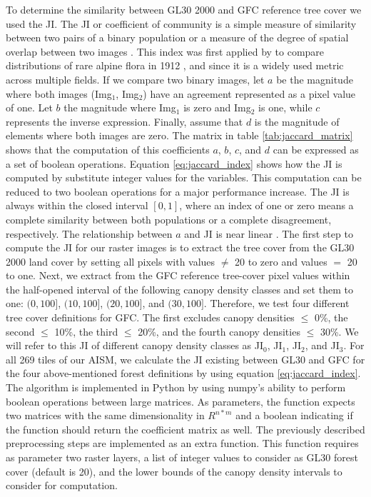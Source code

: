 			To determine the similarity between \ac{GL30} 2000 and \ac{GFC} reference tree cover we used the \ac{JI}. The \ac{JI} or coefficient of community is a simple measure of similarity between two pairs of a binary population or a measure of the degree of spatial overlap between two images \citep{Sampat2009}. This index was first applied by \citeauthor{Jaccard1912} to compare distributions of rare alpine flora in 1912 \citep{Jaccard1912}, and since it is a widely used metric across multiple fields. If we compare two binary images, let $a$ be the magnitude where both images (Img$_1$, Img$_2$) have an agreement represented as a pixel value of one. Let $b$ the magnitude where Img$_1$ is zero and Img$_2$ is one, while $c$ represents the inverse expression. Finally, assume that $d$ is the magnitude of elements where both images are zero. The matrix in table \ref{tab:jaccard_matrix} shows that the computation of this coefficients $a$, $b$, $c$, and $d$ can be expressed as a set of boolean operations. Equation \ref{eq:jaccard_index} shows how the \ac{JI} is computed by substitute integer values for the variables. This computation can be reduced to two boolean operations for a major performance increase. The \ac{JI} is always within the closed interval $[0,1]$, where an index of one or zero means a complete similarity between both populations or a complete disagreement, respectively. The relationship between $a$ and \ac{JI} is near linear \citep{Shi1993}. The first step to compute the \ac{JI} for our raster images is to extract the tree cover from the \ac{GL30} 2000 land cover by setting all pixels with values $\neq$ 20 to zero and values $=$ 20 to one. Next, we extract from the \ac{GFC} reference tree-cover pixel values within the half-opened interval of the following canopy density classes and set them to one: $(0,100]$, $(10,100]$, $(20,100]$, and $(30,100]$. Therefore, we test four different tree cover definitions for \ac{GFC}. The first excludes canopy densities $\leq$ 0\%, the second $\leq$ 10\%, the third $\leq$ 20\%, and the fourth  canopy densities $\leq$ 30\%. We will refer to this \ac{JI} of different canopy density classes as JI$_0$, JI$_1$, JI$_2$, and JI$_3$. For all 269 tiles of our \ac{AISM}, we calculate the \ac{JI} existing between \ac{GL30} and \ac{GFC} for the four above-mentioned forest definitions by using equation \ref{eq:jaccard_index}. The algorithm is implemented in Python by using numpy's ability to perform boolean operations between large matrices. As parameters, the function expects two matrices with the same dimensionality in $R^{n*m}$ and a boolean indicating if the function should return the coefficient matrix as well. The previously described preprocessing steps are implemented as an extra function. This function requires as parameter two raster layers, a list of integer values to consider as \ac{GL30} forest cover (default is 20), and the lower bounds of the canopy density intervals to consider for computation.
